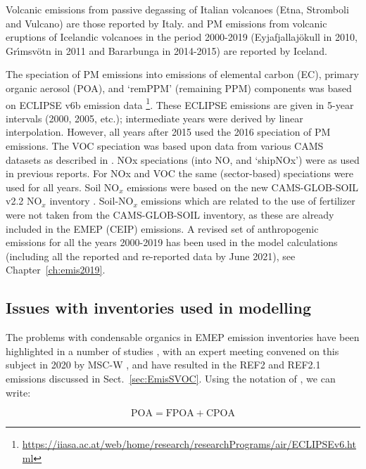 Volcanic \sox emissions from passive degassing of Italian volcanoes (Etna,
Stromboli and Vulcano) are those reported by
Italy. \sox and PM emissions from volcanic eruptions of Icelandic volcanoes in the period 2000-2019 (Eyjafjallaj\"okull in 2010, Gr{\'{\i}}msv{\"{o}}tn in 2011 and  Bar\dh{}arbunga in 2014-2015) are reported by Iceland. 
 
The speciation of PM emissions into emissions of elemental carbon (EC), primary organic aerosol (POA), and `remPPM' (remaining PPM) components was based on ECLIPSE v6b emission data \footnote{\url{https://iiasa.ac.at/web/home/research/researchPrograms/air/ECLIPSEv6.html}}. These ECLIPSE emissions are given in 5-year intervals (2000, 2005, etc.); intermediate years were derived by linear interpolation. However, all years after 2015 used the 2016 speciation of PM emissions. The VOC speciation was based upon data from various CAMS datasets as described in \cite{R2020:ModDev}. NOx speciations (into NO,  and `shipNOx') were as used in previous reports.
For NOx and VOC the same (sector-based) speciations were used for all years.
Soil NO$_x$ emissions were based on the new CAMS-GLOB-SOIL v2.2 NO$_x$ inventory \citet{SimpsonDarras:2021}. Soil-NO$_x$ emissions which are related to the use of fertilizer were not taken from the CAMS-GLOB-SOIL inventory, as these are already included in the EMEP (CEIP) emissions.
A revised set of anthropogenic emissions for all the years 2000-2019 has been used in the model calculations (including all the reported and re-reported data by June 2021), see Chapter~\ref{ch:emis2019}.


\subsection{Issues with inventories used in modelling}
\label{ss:IssuesECOC}

The problems with condensable organics in EMEP emission
inventories have been highlighted in a number of studies
\citep{DeniervanderGon2015,R2015:SVOC,TFMM2018,R2019:SVOC,R2020:CAMSREF2,R2020:SVOC},
with an expert meeting convened on this subject in 2020 by MSC-W
\citep{CONDws2020}, and have resulted in the REF2 and REF2.1 emissions discussed in Sect.~\ref{sec:EmisSVOC}. Using the notation of \citet{CONDws2020}, we can
write:


\begin{equation}
  \mbox{POA} = \mbox{FPOA} + \mbox{CPOA}
\end{equation}

